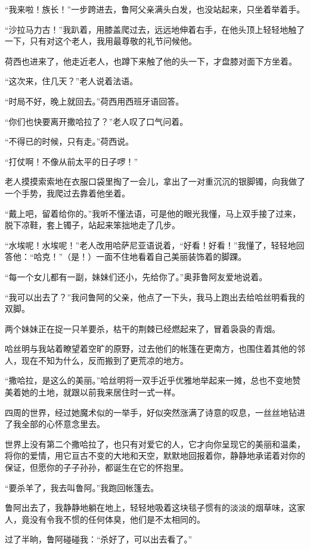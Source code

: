 \par “我来啦！族长！”一步跨进去，鲁阿父亲满头白发，也没站起来，只坐着举着手。
\par “沙拉马力古！”我趴着，用膝盖爬过去，远远地伸着右手，在他头顶上轻轻地触了一下，只有对这个老人，我用最尊敬的礼节问候他。
\par 荷西也进来了，他走近老人，也蹲下来触了他的头一下，才盘膝对面下方坐着。
\par “这次来，住几天？”老人说着法语。
\par “时局不好，晚上就回去。”荷西用西班牙语回答。
\par “你们也快要离开撒哈拉了？”老人叹了口气问着。
\par “不得已的时候，只有走。”荷西说。
\par “打仗啊！不像从前太平的日子啰！”
\par 老人摸摸索索地在衣服口袋里掏了一会儿，拿出了一对重沉沉的银脚镯，向我做了一个手势，我爬过去靠着他坐着。
\par “戴上吧，留着给你的。”我听不懂法语，可是他的眼光我懂，马上双手接了过来，脱下凉鞋，套上镯子，站起来笨拙地走了几步。
\par “水埃呢！水埃呢！”老人改用哈萨尼亚语说着，“好看！好看！”我懂了，轻轻地回答他：“哈克！”（是！）一面不住地看着自己美丽装饰着的脚踝。
\par “每一个女儿都有一副，妹妹们还小，先给你了。”奥菲鲁阿友爱地说着。
\par “我可以出去了？”我问鲁阿的父亲，他点了一下头，我马上跑出去给哈丝明看我的双脚。
\par 两个妹妹正在捉一只羊要杀，枯干的荆棘已经燃起来了，冒着袅袅的青烟。
\par 哈丝明与我站着瞭望着空旷的原野，过去他们的帐篷在更南方，也围住着其他的邻人，现在不知为什么，反而搬到了更荒凉的地方。
\par “撒哈拉，是这么的美丽。”哈丝明将一双手近乎优雅地举起来一摊，总也不变地赞美着她的土地，就跟以前我来居住时一式一样。
\par 四周的世界，经过她魔术似的一举手，好似突然涨满了诗意的叹息，一丝丝地钻进了我全部的心怀意念里去。
\par 世界上没有第二个撒哈拉了，也只有对爱它的人，它才向你呈现它的美丽和温柔，将你的爱情，用它亘古不变的大地和天空，默默地回报着你，静静地承诺着对你的保证，但愿你的子子孙孙，都诞生在它的怀抱里。
\par “要杀羊了，我去叫鲁阿。”我跑回帐篷去。
\par 鲁阿出去了，我静静地躺在地上，轻轻地吸着这块毯子惯有的淡淡的烟草味，这家人，竟没有令我不惯的任何体臭，他们是不太相同的。
\par 过了半晌，鲁阿碰碰我：“杀好了，可以出去看了。”
